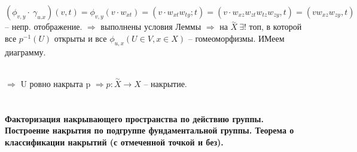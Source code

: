 	$(\phi_{v,y} \cdot\ \gamma_{u.x})(v,t) = \phi_{v,y}(v\cdot w_{xt}) = (v\cdot w_{xt} w_{ty}; t) = (v\cdot w_{xz} w_{zt} w_{tz} w_{zy}, t) = (v w_{xz} w_{zy}, t)$ -- непр. отображение. $\Rightarrow$ выполнены условия Леммы $\Rightarrow$ на $\overset{\sim}{X}\ \exists$! топ, в которой все $p^{-1}(U)$ открыты и все $\phi_{u,x}(U\in V, x\in X)$ -- гомеоморфизмы. ИМеем диаграмму.\\
	\begin{figure}[h]
	\end{figure}\\
	$\Rightarrow$ U ровно накрыта p $\Rightarrow p: \overset{\sim}{X} \rightarrow X$ -- накрытие.



\newpage
	\section{}
	\textbf{Факторизация накрывающего пространства по действию группы. Построение накрытия по подгруппе фундаментальной группы. Теорема о классификации накрытий (с отмеченной точкой и без).}\\
	\\	

